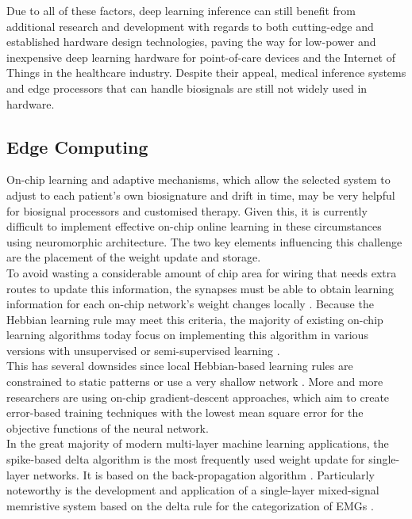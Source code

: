\noindent Due to all of these factors, deep learning inference can still benefit from additional research and development with regards to both cutting-edge and established hardware design technologies, paving the way for low-power and inexpensive deep learning hardware for point-of-care devices and the Internet of Things in the healthcare industry. Despite their appeal, medical inference systems and edge processors that can handle biosignals are still not widely used in hardware.

\subsection[Edge Computing]{Edge Computing}

\noindent  On-chip learning and adaptive mechanisms, which allow the selected system to adjust to each patient's own biosignature and drift in time, may be very helpful for biosignal processors and customised therapy. Given this, it is currently difficult to implement effective on-chip online learning in these circumstances using neuromorphic architecture. The two key elements influencing this challenge are the placement of the weight update and storage. \\

\noindent To avoid wasting a considerable amount of chip area for wiring that needs extra routes to update this information, the synapses must be able to obtain learning information for each on-chip network's weight changes locally \cite{frenkel20180}. Because the Hebbian learning rule may meet this criteria, the majority of existing on-chip learning algorithms today focus on implementing this algorithm in various versions with unsupervised or semi-supervised learning  \cite{frenkel2019morphic}. \\

\noindent This has several downsides since local Hebbian-based learning rules are constrained to static patterns or use a very shallow network \cite{azghadi2015programmable}. More and more researchers are using on-chip gradient-descent approaches, which aim to create error-based training techniques with the lowest mean square error for the objective functions of the neural network. \\

\noindent In the great majority of modern multi-layer machine learning applications, the spike-based delta algorithm is the most frequently used weight update for single-layer networks. It is based on the back-propagation algorithm \cite{payvand2019spike}. Particularly noteworthy is the development and application of a single-layer mixed-signal memristive system based on the delta rule for the categorization of EMGs \cite{kaiser2020synaptic}. \\

